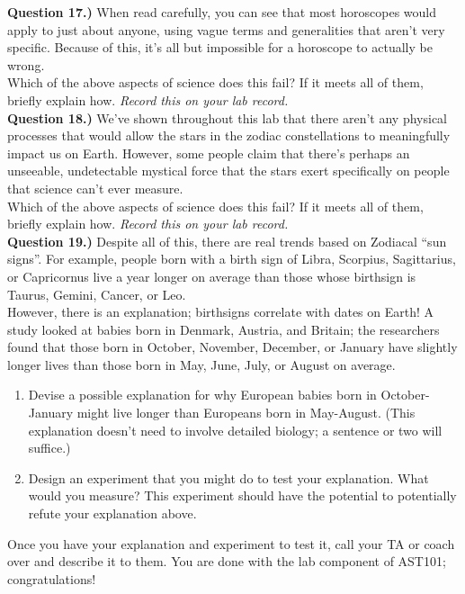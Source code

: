 \documentclass[11pt]{article}
\begin{document}
\textbf{Question 17.)} When read carefully, you can see that most horoscopes would apply to just about anyone, using vague terms and generalities that aren't very specific. Because of this, it's all but impossible for a horoscope to actually be wrong.\\

Which of the above aspects of science does this fail? If it meets all of them, briefly explain how. {\it Record this on your lab record.}\\



\textbf{Question 18.)} We've shown throughout this lab that there aren't any physical processes that would allow the stars in the zodiac constellations to meaningfully impact us on Earth. However, some people claim that there's perhaps an unseeable, undetectable mystical force that the stars exert specifically on people that science can't ever measure.\\

Which of the above aspects of science does this fail? If it meets all of them, briefly explain how. {\it Record this on your lab record.}\\
%

\textbf{Question 19.)} Despite all of this, there {\it} are real trends based on Zodiacal ``sun signs''. For example, people born with a birth sign of Libra, Scorpius, Sagittarius, or Capricornus live a year longer on average than those whose birthsign is Taurus, Gemini, Cancer, or Leo.\\

However, there is an explanation; birthsigns correlate with dates on Earth! A study looked at babies born in Denmark, Austria, and Britain; the researchers found that those born in October, November, December, or January have slightly longer lives than those born in May, June, July, or August on average.



\bigskip


\begin{enumerate}
	\item Devise a possible explanation for why European babies born in October-January might live longer than Europeans born in May-August. (This explanation doesn't need to involve detailed biology; a sentence or two will suffice.)
	\item Design an experiment that you might do to test your explanation. What would you measure? This experiment should have the potential to potentially refute your explanation above.
\end{enumerate}

Once you have your explanation and experiment to test it, call your TA or coach over and describe it to them. You are done with the lab component of AST101; congratulations!

\vspace{1.5cm}
\hrulefill
\end{document}
